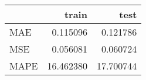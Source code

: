 \begin{tabular}{lrr}
\toprule
{} &      train &       test \\
\midrule
MAE  &   0.115096 &   0.121786 \\
MSE  &   0.056081 &   0.060724 \\
MAPE &  16.462380 &  17.700744 \\
\bottomrule
\end{tabular}
